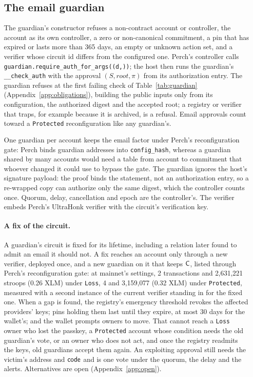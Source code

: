 \subsection{The email guardian}\label{sec:design-guardian}
The guardian's constructor refuses a non-contract account or controller, the
account as its own controller, a zero or non-canonical commitment, a pin that
has expired or lasts more than 365 days, an empty or unknown action set, and
a verifier whose circuit id differs from the configured
one. Perch's controller calls
\texttt{guardian.require\_auth\_for\_args((d,))}; the host then runs the
guardian's \texttt{\_\_check\_auth} with the approval $(S, \mathit{root},
\pi)$ from its authorization entry. The guardian refuses at the first failing
check of Table~\ref{tab:guardian} (Appendix~\ref{app:obligations}), building the public inputs only from its
configuration, the authorized digest and the accepted
root; a registry or verifier that traps, for example
because it is archived, is a refusal. Email approvals count toward a
\texttt{Protected} reconfiguration like any guardian's.

One guardian per account keeps the email factor under Perch's
reconfiguration gate: Perch binds guardian addresses into
\texttt{config\_hash}, whereas a guardian shared by many accounts would need a
table from account to commitment that whoever changed it could use to bypass
the gate. The guardian ignores the host's signature payload: the proof binds
the statement, not an authorization entry, so a re-wrapped copy can authorize
only the same digest, which the controller counts
once. Quorum, delay, cancellation and
epoch are the controller's. The verifier embeds Perch's UltraHonk verifier
with the circuit's verification key.

\paragraph{A fix of the circuit.} A guardian's circuit is fixed for its
lifetime, including a relation later found to admit an email it should not.
A fix reaches an account only through a new verifier, deployed once, and a
new guardian on it that keeps $\mathsf{C}$, listed through Perch's reconfiguration
gate: at mainnet's settings, 2 transactions and 2{,}631{,}221 stroops (0.26
XLM) under \texttt{Loss}, 4 and 3{,}159{,}077 (0.32 XLM) under
\texttt{Protected}, measured with a second instance of the current verifier
standing in for the fixed one. When a gap is found, the
registry's emergency threshold revokes the affected providers' keys; pins
holding them last until they expire, at most 30 days for the wallet's; and
the wallet prompts owners to move. That cannot reach a \texttt{Loss} owner
who lost the passkey, a \texttt{Protected} account whose condition needs the
old guardian's vote, or an owner who does not act, and once the registry
readmits the keys, old guardians accept them again. An exploiting approval
still needs the victim's address and $\mathsf{code}$ and is one vote under the
quorum, the delay and the alerts. Alternatives are open
(Appendix~\ref{app:open}).

